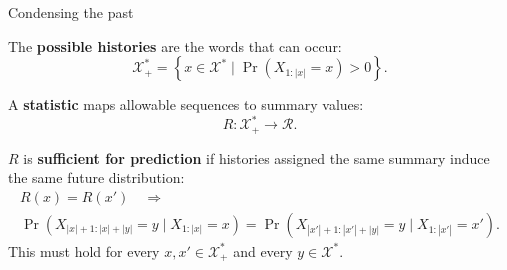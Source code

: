 \documentclass[aspectratio=169,12pt,t]{beamer}
\begin{document}
\begin{frame}{Condensing the past}
  \setlength{\parskip}{0pt}
  \setlength{\abovedisplayskip}{4pt}
  \setlength{\belowdisplayskip}{4pt}

  The \textbf{possible histories} are the words that can occur:
  \[
    \mathcal X_+^*
      =\left\{x\in\mathcal X^*\mid \Pr(X_{1:|x|}=x)>0\right\}.
  \]

  \vspace{3mm}
  A \textbf{statistic} maps allowable sequences to summary values:
  \[
    R:\mathcal X_+^*\to\mathcal R.
  \]

  \vspace{3mm}
  $R$ is \textbf{sufficient for prediction} if histories assigned the same
  summary induce the same future distribution:
  \[
    \begin{gathered}
      R(x)=R(x')\quad\Longrightarrow\\[1mm]
      \Pr\!\left(
        X_{|x|+1:|x|+|y|}=y\mid X_{1:|x|}=x
      \right)
      =\Pr\!\left(
        X_{|x'|+1:|x'|+|y|}=y\mid X_{1:|x'|}=x'
      \right).
    \end{gathered}
  \]
  \vspace{3mm}
  This must hold for every $x,x'\in\mathcal X_+^*$ and every
  $y\in\mathcal X^*$.

  \vfill

\end{frame}
\end{document}
